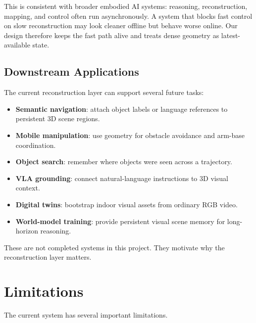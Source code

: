 \documentclass[11pt]{article}
\begin{document}
This is consistent with broader embodied AI systems: reasoning, reconstruction, mapping, and control often run asynchronously. A system that blocks fast control on slow reconstruction may look cleaner offline but behave worse online. Our design therefore keeps the fast path alive and treats dense geometry as latest-available state.

\subsection{Downstream Applications}

The current reconstruction layer can support several future tasks:

\begin{itemize}
    \item \textbf{Semantic navigation}: attach object labels or language references to persistent 3D scene regions.
    \item \textbf{Mobile manipulation}: use geometry for obstacle avoidance and arm-base coordination.
    \item \textbf{Object search}: remember where objects were seen across a trajectory.
    \item \textbf{VLA grounding}: connect natural-language instructions to 3D visual context.
    \item \textbf{Digital twins}: bootstrap indoor visual assets from ordinary RGB video.
    \item \textbf{World-model training}: provide persistent visual scene memory for long-horizon reasoning.
\end{itemize}

These are not completed systems in this project. They motivate why the reconstruction layer matters.

\section{Limitations}

The current system has several important limitations.
\end{document}

